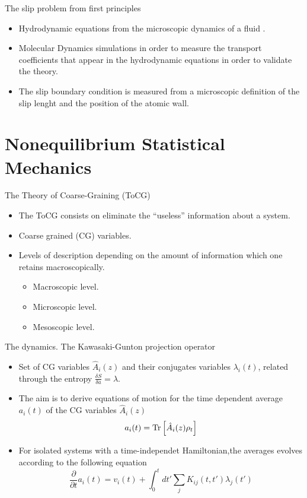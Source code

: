 \documentclass{beamer}
\begin{document}
\begin{frame}{The slip problem from first principles}
  \begin{itemize}
\item Hydrodynamic equations from the microscopic dynamics of a fluid \cite{Piccirelli1968}.
\item Molecular Dynamics simulations in order to measure the transport coefficients that appear in the hydrodynamic equations in order to validate the theory.
\item The slip boundary condition is measured from a microscopic definition of the slip lenght and the position of the atomic wall. 
\end{itemize}
\end{frame}

\section{Nonequilibrium Statistical Mechanics}
\begin{frame}{The Theory of Coarse-Graining (ToCG)}
\begin{itemize}
\item The ToCG consists on eliminate the ``useless'' information about a system. 
\item Coarse grained (CG) variables.
\item Levels of description depending on the amount of information which one retains macroscopically.
  \begin{itemize}
    \item Macroscopic level.
    \item Microscopic level.
    \item Mesoscopic level.
    \end{itemize}
\end{itemize}
\end{frame}

\begin{frame}{The dynamics. The Kawasaki-Gunton projection operator}
  \begin{itemize}
    \item Set of CG variables $\hat{A}_i(z)$ and their conjugates variables $\lambda_i(t)$, related through the entropy $\frac{\delta S}{\delta a}=\lambda$.
    \item The aim is to derive equations of motion for the time dependent average $a_i(t)$ of the CG variables $\hat{A}_i(z)$
      \begin{align}
        a_i(t)={\rm Tr}\left[\hat{A}_i(z)\rho_t\right]
        \nonumber
      \end{align}
    \item For isolated systems with a time-independet Hamiltonian,the averages evolves according to the following equation \cite{Grabert1982}
      \begin{equation}
\frac{\partial }{\partial t} a_i(t)
= v_i(t) + \int_0^t dt' \sum_j K_{ij}(t,t') \lambda_j(t')
\nonumber
\label{ex}
\end{equation}
\end{itemize}
\end{frame}
\end{document}
